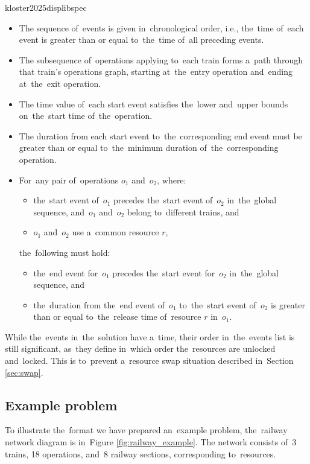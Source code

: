 \begin{displaycquote}{kloster2025displibspec}
    \begin{itemize}
        \item The sequence of~events is given in~chronological order, i.e., the~time of~each event is greater than or equal to~the~time of~all preceding events.
        \item The subsequence of~operations applying to~each train forms a~path through that train’s operations graph, starting at~the~entry operation and~ending at~the~exit operation.
        \item The time value of~each start event satisfies the~lower and~upper bounds on~the~start time of~the~operation.
        \item The duration from each start event to~the~corresponding end event must be greater than or equal to~the~minimum duration of~the~corresponding operation.
    \item For~any pair of~operations $o_1$ and~$o_2$, where:
        \begin{itemize}
            \item the~start event of~$o_1$ precedes the~start event of~$o_2$ in~the~global sequence, and~$o_1$ and~$o_2$ belong to~different trains, and
            \item $o_1$ and~$o_2$ use a~common resource $r$,
        \end{itemize}
        the~following must hold:
        \begin{itemize}
            \item the~end event for~$o_1$ precedes the~start event for~$o_2$ in~the~global sequence, and
            \item the~duration from the~end event of~$o_1$ to~the~start event of~$o_2$ is greater than or equal to~the~release time of~resource $r$ in~$o_1$.
        \end{itemize}
    \end{itemize}
\end{displaycquote}

\newpage
While the~events in~the~solution have a~time, their order in~the~events list is still significant, as~they define in~which order the~resources are unlocked and~locked. This is to~prevent a~resource swap situation described in~Section \ref{sec:swap}.

\subsection{Example problem}
To illustrate the~format we have prepared an~example problem, the~railway network diagram is in~Figure \ref{fig:railway_example}. The network consists of~3 trains, 18 operations, and~8 railway sections, corresponding to~resources.

